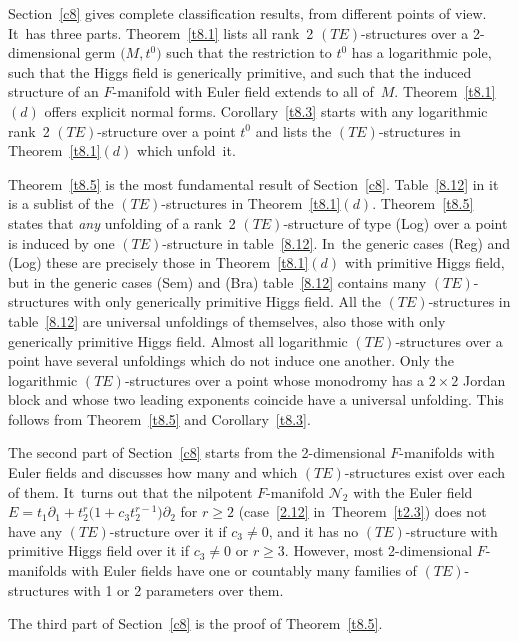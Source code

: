 \documentclass[10pt,a4paper]{amsart}
\numberwithin{equation}{section}
\numberwithin{figure}{section}
\newcommand{\NN}{{\mathcal N}}
\newcommand{\paa}{\partial}
\begin{document}
Section~\ref{c8} gives complete classification results,
from different points of view. It~has three parts.
Theorem~\ref{t8.1} lists all rank~2 $(TE)$-structures
over a 2-dimensional germ $\big(M,t^0\big)$ such that the restriction
to $t^0$ has a logarithmic pole, such that the
Higgs field is generically primi\-tive,
and such that the induced structure of an $F$-manifold with
Euler field extends to all of~$M$. Theorem~\ref{t8.1}$(d)$
offers explicit normal forms.
Corollary~\ref{t8.3} starts with any logarithmic
rank~2 $(TE)$-structure over a point $t^0$ and lists
the $(TE)$-structures in Theorem~\ref{t8.1}$(d)$
which unfold~it.

Theorem~\ref{t8.5} is the most fundamental result of
Section~\ref{c8}. Table~\eqref{8.12} in it is a sublist
of the $(TE)$-structures in Theorem~\ref{t8.1}$(d)$. Theorem~\ref{t8.5} states that {\it any} unfolding of a rank~2
$(TE)$-structure of type (Log) over a point
is induced by one $(TE)$-structure in table~\eqref{8.12}. In~the generic cases (Reg) and (Log) these are precisely
those in Theorem~\ref{t8.1}$(d)$ with primitive Higgs field,
but in the generic cases (Sem) and (Bra) table~\eqref{8.12}
contains many $(TE)$-structures with only generically
primitive Higgs field. All the $(TE)$-structures in
table~\eqref{8.12} are universal unfoldings of themselves,
also those with only generically primitive Higgs field.
Almost all logarithmic $(TE)$-structures over a point
have several unfoldings which do not induce one another.
Only the logarithmic $(TE)$-structures over a point whose
monodromy has a $2\times 2$ Jordan block and whose
two leading exponents coincide have a universal unfolding.
This follows from Theorem~\ref{t8.5} and Corollary~\ref{t8.3}.

The second part of Section~\ref{c8} starts from the
2-dimensional $F$-manifolds with Euler fields and
discusses how many and which $(TE)$-structures exist over
each of them. It~turns out that the nilpotent $F$-manifold
$\NN_2$ with the Euler field
$E=t_1\paa_1+t_2^r\big(1+c_3t_2^{r-1}\big)\paa_2$ for $r\geq 2$
(case~\eqref{2.12} in~Theorem~\ref{t2.3}) does not have
any $(TE)$-structure over it if $c_3\neq 0$,
and it has no $(TE)$-structure with primitive Higgs field
over it if $c_3\neq 0$ or $r\geq 3$.
However, most 2-dimensional $F$-manifolds with Euler fields
have one or countably many families of $(TE)$-structures
with 1 or 2 parameters over them.

The third part of Section~\ref{c8} is the proof of Theorem~\ref{t8.5}.
\end{document}
